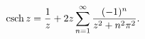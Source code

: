 \[\mathop{\mathrm{csch}\/}\nolimits z=\frac{1}{z}+2z\sum_{n=1}^{\infty}\frac{(-1%
)^{n}}{z^{2}+n^{2}\pi^{2}}.\]